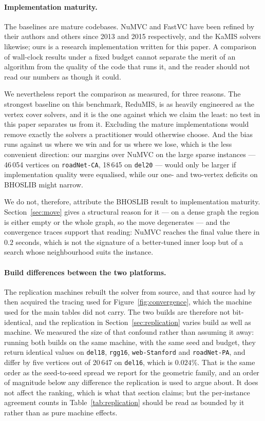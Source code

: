 \documentclass[preprint,12pt]{elsarticle}
\theoremstyle{definition}
\begin{document}
\paragraph{Implementation maturity.} The baselines are mature codebases. NuMVC
and FastVC have been refined by their authors and others since 2013 and 2015
respectively, and the KaMIS solvers likewise; ours is a research implementation
written for this paper. A comparison of wall-clock results under a fixed budget
cannot separate the merit of an algorithm from the quality of the code that runs
it, and the reader should not read our numbers as though it could.

We nevertheless report the comparison as measured, for three reasons. The
strongest baseline on this benchmark, ReduMIS, is as heavily engineered as the
vertex cover solvers, and it is the one against which we claim the least: no
test in this paper separates us from it. Excluding the mature implementations
would remove exactly the solvers a practitioner would otherwise choose. And the
bias runs against us where we win and for us where we lose, which is the less
convenient direction: our margins over NuMVC on the large sparse instances ---
46\,054 vertices on \texttt{roadNet-CA}, 18\,645 on \texttt{del20} --- would only
be larger if implementation quality were equalised, while our one- and two-vertex
deficits on BHOSLIB might narrow.

We do not, therefore, attribute the BHOSLIB result to implementation maturity.
Section~\ref{sec:move} gives a structural reason for it --- on a dense graph the
region is either empty or the whole graph, so the move degenerates --- and the
convergence traces support that reading: NuMVC reaches the final value there in
$0.2$ seconds, which is not the signature of a better-tuned inner loop but of a
search whose neighbourhood suits the instance.

\paragraph{Build differences between the two platforms.} The replication
machines rebuilt the solver from source, and that source had by then acquired
the tracing used for Figure~\ref{fig:convergence}, which the machine used for
the main tables did not carry. The two builds are therefore not bit-identical,
and the replication in Section~\ref{sec:replication} varies build as well as
machine. We measured the size of that confound rather than assuming it away:
running both builds on the same machine, with the same seed and budget, they
return identical values on \texttt{del18}, \texttt{rgg16}, \texttt{web-Stanford}
and \texttt{roadNet-PA}, and differ by five vertices out of 20\,647 on
\texttt{del16}, which is $0.024\%$. That is the same order as the seed-to-seed
spread we report for the geometric family, and an order of magnitude below any
difference the replication is used to argue about. It does not affect the
ranking, which is what that section claims; but the per-instance agreement
counts in Table~\ref{tab:replication} should be read as bounded by it rather
than as pure machine effects.
\end{document}
